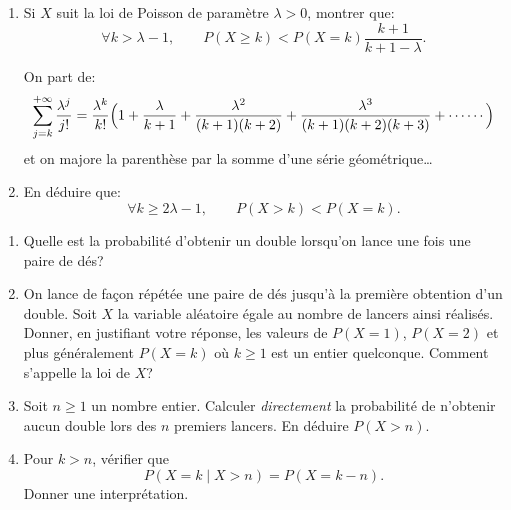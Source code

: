 \documentclass[a4paper,12pt,reqno]{amsart}
\begin{document}
\begin{exo}

  \begin{enumerate}
    \item Si $X$ suit la loi de Poisson de paramètre $\lambda>0$, montrer que:
      $$
        \forall k>\lambda-1,\qquad P(X\geq k)<P(X=k)\frac{k+1}{k+1-\lambda}.
      $$
      \begin{indication}
      On part de:
        $$
          \sum_{j=k}^{+\infty}\frac{\lambda^j}{j!}=
            \frac{\lambda^k}{k!}\Bigl(1+\frac{\lambda}{k+1}+
              \frac{\lambda^2}{(k+1)(k+2)}+\frac{\lambda^3}{(k+1)(k+2)(k+3)}
                + \cdots\cdots\Bigr)
        $$
      et on majore la parenthèse par la somme d'une série géométrique\dots
      \end{indication}
    \item En déduire que:
      $$
        \forall k\geq 2\lambda-1,\qquad P(X>k)<P(X=k).
      $$
  \end{enumerate}

\end{exo}
\begin{exo}

  \begin{enumerate}
    \item Quelle est la probabilité d'obtenir un double lorsqu'on lance une fois une paire de dés?
    \item On lance de façon répétée une paire de dés jusqu'à la première obtention d'un double. Soit $X$ la variable aléatoire égale au nombre de lancers ainsi réalisés. Donner, en justifiant votre réponse, les valeurs de $P(X=1)$, $P(X=2)$ et plus généralement $P(X=k)$ où $k\geq 1$ est un entier quelconque. Comment s'appelle la loi de $X$?
    \item Soit $n\geq 1$ un nombre entier. Calculer \emph{directement} la probabilité de n'obtenir aucun double lors des $n$ premiers lancers. En déduire $P(X>n)$.
    \item Pour $k>n$, vérifier que
      $$
        P(X=k \mid X>n)=P(X=k-n).
      $$
    Donner une interprétation.
  \end{enumerate}

\end{exo}
\end{document}
